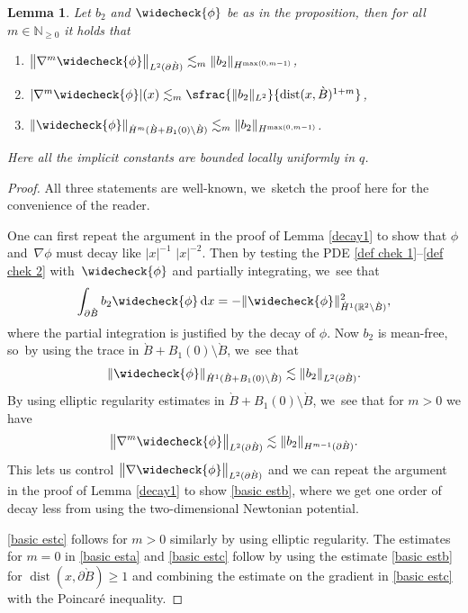 \documentclass[JEP,XML,SOM,Unicode,published]{cedram}
\let\backslash\setminus
\newtheorem{lemma}[theorem]{Lemma}
\theoremstyle{definition}
\DeclareMathOperator{\dist}{dist}
\newcommand\R{\mathbb{R}}
\newcommand\N{\mathbb{N}}
\newcommand\anorm[1]{\lVert #1\rVert}
\newcommand\bnorm[1]{\bigl\lVert #1\bigr\rVert}
\newcommand\eq{=}
\newcommand\dd{\,\mathrm{d}}
\newcommand\dx{\dd x}
\let\chek\widecheck
\let\de\partial
\begin{document}
\begin{lemma}\label{basic est}
Let $b_2$ and $\chek{\phi}$ be as in the proposition, then for all $m\in \N_{\geq 0}$ it holds that
\begin{enumerate}
\item\label{basic esta}
$\bnorm{\nabla^m\chek{\phi}}_{L^2(\de \grave{B})}\lesssim_m\anorm{b_2}_{{H}^{\max(0,m-1)}}$,
\item\label{basic estb}
$|\nabla^m\chek{\phi}|(x)\lesssim_m \sfrac{\anorm{b_2}_{L^2}}{\dist(x,\grave{B})^{1+m}}$,
\item\label{basic estc}
$\anorm{\chek{\phi}}_{\dot{H}^m(\grave{B}+B_1(0)\backslash \grave{B})}\lesssim_m  \anorm{b_2}_{H^{\max(0,m-1)}}$.
\end{enumerate}
Here all the implicit constants are bounded locally uniformly in $q$.
\end{lemma}
\begin{proof} All three statements are well-known, we~sketch the proof here for the convenience of the reader.

One can first repeat the argument in the proof of Lemma \ref{decay1} to show that $\phi$ and~$\nabla\phi$ must decay like $|x|^{-1}$ \resp $|x|^{-2}$.
Then by testing the PDE \eqref{def chek 1}--\eqref{def chek 2} with~$\chek{\phi}$ and partially integrating, we~see that
\begin{align*}
\int_{\de \grave{B}}b_2\chek{\phi}\dx\eq -\anorm{\chek{\phi}}_{\dot{H}^1(\R^2\backslash \grave{B})}^2,
\end{align*}
where the partial integration is justified by the decay of $\phi$.
Now $b_2$ is mean-free, so~by using the trace in $\grave{B}+B_1(0)\backslash \grave{B}$, we~see that
\begin{align*}
\anorm{\chek{\phi}}_{\dot{H}^1(\grave{B}+B_1(0)\backslash \grave{B})}\lesssim \anorm{b_2}_{L^2(\de \grave{B})}.
\end{align*}
By using elliptic regularity estimates in $\grave{B}+B_1(0)\backslash \grave{B}$, we~see that for $m>0$ we have
\begin{align*}
\bnorm{\nabla^m\chek{\phi}}_{L^2(\de \grave{B})}\lesssim \anorm{b_2}_{H^{m-1}(\de \grave{B})}.
\end{align*}
This lets us control $\bnorm{\nabla \chek{\phi}}_{L^2(\de\grave{B})}$ and we can repeat the argument in the proof of Lemma \ref{decay1} to show \eqref{basic estb}, where we get one order of decay less from using the two-dimensional Newtonian potential.

\eqref{basic estc} follows for $m>0$ similarly by using elliptic regularity. The estimates for $m=0$ in \eqref{basic esta} and \eqref{basic estc} follow by using the estimate \eqref{basic estb} for $\dist(x,\de\grave{B})\geq 1$ and combining the estimate on the gradient in \eqref{basic estc} with \eg the Poincaré inequality.
\end{proof}
\end{document}

